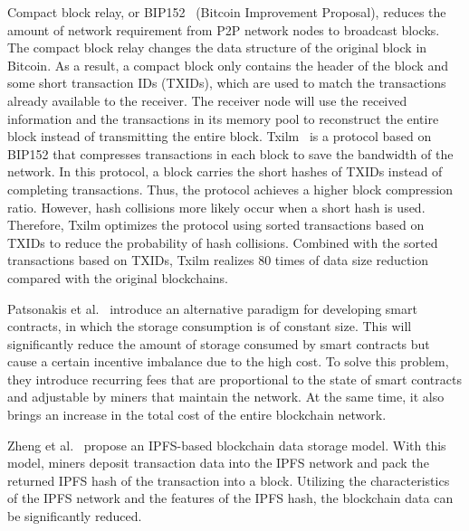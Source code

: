 \documentclass[acmsmall]{acmart}
\begin{document}
Compact block relay, or BIP152~\cite{corallo2016bip152} (Bitcoin Improvement Proposal), reduces the amount of network requirement from P2P network nodes to broadcast blocks. The compact block relay changes the data structure of the original block in Bitcoin. As a result, a compact block only contains the header of the block and some short transaction IDs (TXIDs), which are used to match the transactions already available to the receiver. The receiver node will use the received information and the transactions in its memory pool to reconstruct the entire block instead of transmitting the entire block. Txilm~\cite{ding2019txilm} is a protocol based on BIP152 that compresses transactions in each block to save the bandwidth of the network.  In this protocol, a block carries the short hashes of TXIDs instead of completing transactions. Thus, the protocol achieves a higher block compression ratio. However, hash collisions more likely occur when a short hash is used. Therefore, Txilm optimizes the protocol using sorted transactions based on TXIDs to reduce the probability of hash collisions. Combined with the sorted transactions based on TXIDs, Txilm realizes 80 times of data size reduction compared with the original blockchains.


Patsonakis et al.~\cite{patsonakis2019alternative} introduce an alternative paradigm for developing smart contracts, in which the storage consumption is of constant size. This will significantly reduce the amount of storage consumed by smart contracts but cause a certain incentive imbalance due to the high cost. To solve this problem, they introduce recurring fees that are proportional to the state of smart contracts and adjustable by miners that maintain the network.  
At the same time, it also brings an increase in the total cost of the entire blockchain network.


Zheng et al.~\cite{zheng2018innovative} propose an IPFS-based blockchain data storage model. With this model, miners deposit transaction data into the IPFS network and pack the returned IPFS hash of the transaction into a block. Utilizing the characteristics of the IPFS network and the features of the IPFS hash, the blockchain data can be significantly reduced.
\end{document}
